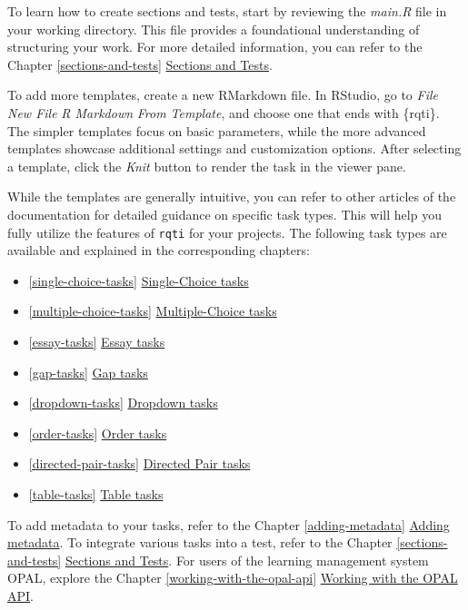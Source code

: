 \documentclass[twoside]{tufte-book}
\providecommand{\tightlist}{%
  \setlength{\itemsep}{0pt}\setlength{\parskip}{0pt}}
\begin{document}
To learn how to create sections and tests, start by reviewing the \emph{main.R} file in your working directory. This file provides a foundational understanding of structuring your work. For more detailed information, you can refer to the Chapter \ref{sections-and-tests} \href{articles/section.html}{Sections and Tests}.

To add more templates, create a new RMarkdown file. In RStudio, go to \emph{File} \textrightarrow{} \emph{New File} \textrightarrow{} \emph{R Markdown} \textrightarrow{} \emph{From Template}, and choose one that ends with \{rqti\}. The simpler templates focus on basic parameters, while the more advanced templates showcase additional settings and customization options. After selecting a template, click the \emph{Knit} button to render the task in the viewer pane.

While the templates are generally intuitive, you can refer to other articles of the documentation for detailed guidance on specific task types. This will help you fully utilize the features of \texttt{rqti} for your projects. The following task types are available and explained in the corresponding chapters:

\begin{itemize}
\tightlist
\item
  \ref{single-choice-tasks} \href{articles/singlechoice.html}{Single-Choice tasks}
\item
  \ref{multiple-choice-tasks} \href{articles/multiplechoice.html}{Multiple-Choice tasks}
\item
  \ref{essay-tasks} \href{articles/essay.html}{Essay tasks}
\item
  \ref{gap-tasks} \href{articles/gap.html}{Gap tasks}
\item
  \ref{dropdown-tasks} \href{articles/dropdown.html}{Dropdown tasks}
\item
  \ref{order-tasks} \href{articles/order.html}{Order tasks}
\item
  \ref{directed-pair-tasks} \href{articles/directedpairs.html}{Directed Pair tasks}
\item
  \ref{table-tasks} \href{articles/table.html}{Table tasks}
\end{itemize}

To add metadata to your tasks, refer to the Chapter \ref{adding-metadata} \href{articles/adding_metadata.html}{Adding metadata}.
To integrate various tasks into a test, refer to the Chapter \ref{sections-and-tests} \href{articles/section.html}{Sections and Tests}.
For users of the learning management system OPAL, explore the Chapter \ref{working-with-the-opal-api} \href{articles/api_opal.html}{Working with the OPAL API}.
\end{document}
